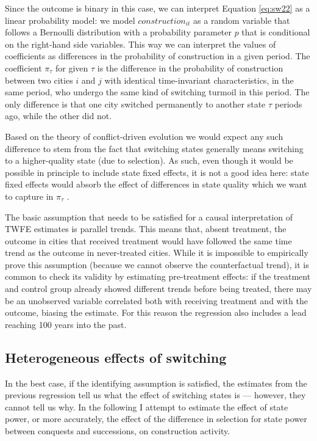 \documentclass[11pt, a4paper]{article}
\begin{document}
Since the outcome is binary in this case, we can interpret Equation \eqref{eq:sw22} as a linear probability model: we model $construction_{it}$ as a random variable that follows a Bernoulli distribution with a probability parameter $p$ that is conditional on the right-hand side variables. This way we can interpret the values of coefficients as differences in the probability of construction in a given period. The coefficient $\pi_\tau$ for given $\tau$ is the difference in the probability of construction between two cities $i$ and $j$ with identical time-invariant characteristics, in the same period, who undergo the same kind of switching turmoil in this period. The only difference is that one city switched permanently to another state $\tau$ periods ago, while the other did not.


Based on the theory of conflict-driven evolution we would expect any such difference to stem from the fact that switching states generally means switching to a higher-quality state (due to selection). As such, even though it would be possible in principle to include state fixed effects, it is not a good idea here: state fixed effects would absorb the effect of differences in state quality which we want to capture in $\pi_\tau$ \citep[p. 13]{schoenholzer2022}.

The basic assumption that needs to be satisfied for a causal interpretation of TWFE estimates is parallel trends. This means that, absent treatment, the outcome in cities that received treatment would have followed the same time trend as the outcome in never-treated cities. While it is impossible to empirically prove this assumption (because we cannot observe the counterfactual trend), it is common to check its validity by estimating pre-treatment effects: if the treatment and control group already showed different trends before being treated, there may be an unobserved variable correlated both with receiving treatment and with the outcome, biasing the estimate. For this reason the regression also includes a lead reaching 100 years into the past.


\subsection{Heterogeneous effects of switching}

In the best case, if the identifying assumption is satisfied, the estimates from the previous regression tell us what the effect of switching states is --- however, they cannot tell us why. In the following I attempt to estimate the effect of state power, or more accurately, the effect of the difference in selection for state power between conquests and successions, on construction activity. 
\end{document}
